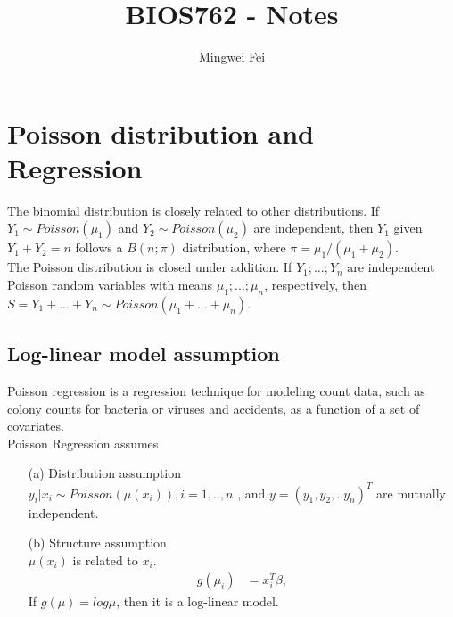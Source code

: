 \documentclass[11pt]{article} %
\title{BIOS762 - Notes}
\author{Mingwei Fei}
\begin{document}
	
\maketitle
\section{Poisson distribution and Regression}
	The binomial distribution is closely related to other distributions. If $Y_1 \sim Poisson(\mu_1)$ and $Y_2 \sim Poisson(\mu_2)$ are independent, then $Y_1$ given $Y_1 + Y_2 = n$ follows a $B(n; \pi)$ distribution, where $\pi = \mu_1/(\mu_1 + \mu_2)$.\\
	The Poisson distribution is closed under addition. If $Y_1; ... ;Y_n$ are independent Poisson random variables with means $\mu_1; ... ; \mu_n$, respectively, then $S = Y_1 + ... + Y_n \sim Poisson(\mu_1 + ... + \mu_n)$.

\subsection{Log-linear model assumption}
Poisson regression is a regression technique for modeling count data, such as colony counts for bacteria or viruses and accidents, as a function of a set of covariates.\\
Poisson Regression assumes
\begin{itemize}
\item[(a)] Distribution assumption\\
$y_i|x_i \sim Poisson(\mu(x_i)), i = 1, .., n$ , and $y = (y_1, y_2,.. y_n)^T$ are mutually independent. 

\item[(b)] Structure assumption\\
$\mu(x_i)$ is related to $x_i$. 
   \begin{align*}
  g( \mu_i) &= x_i^T\beta, 
\end{align*}
If $g(\mu)= log \mu$, then it is a log-linear model.

\end{itemize}
\end{document}
